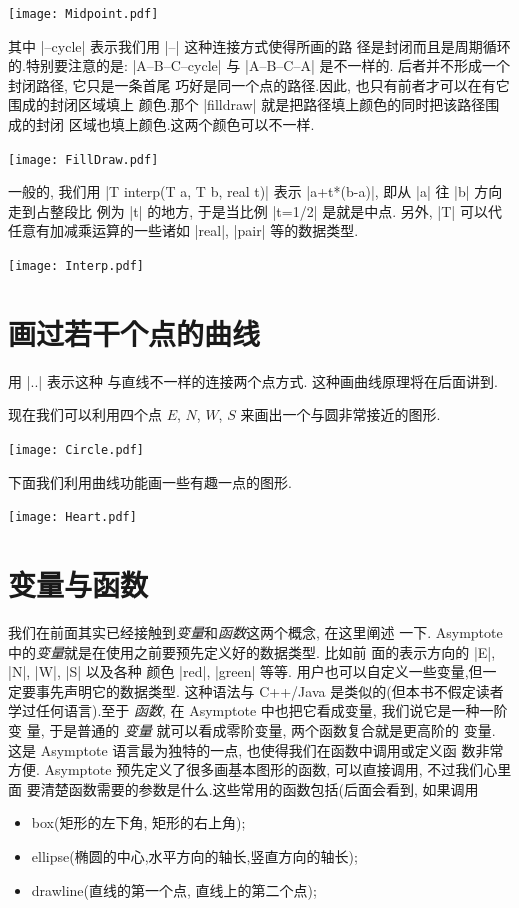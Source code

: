 \documentclass[nofonts,CJKnormalspaces]{ctexbook}
\begin{document}
\begin{center}\texttt{[image: Midpoint.pdf]}\end{center}%


其中 |--cycle| 表示我们用 |--| 这种连接方式使得所画的路
径是封闭而且是周期循环的.特别要注意的是: |A--B--C--cycle| 与
|A--B--C--A| 是不一样的. 后者并不形成一个封闭路径, 它只是一条首尾
巧好是同一个点的路径.因此, 也只有前者才可以在有它围成的封闭区域填上
颜色.那个 |filldraw| 就是把路径填上颜色的同时把该路径围成的封闭
区域也填上颜色.这两个颜色可以不一样.
\begin{center}\texttt{[image: FillDraw.pdf]}\end{center}%


一般的, 我们用 |T interp(T a, T b, real t)| 表示
|a+t*(b-a)|, 即从 |a| 往 |b| 方向走到占整段比
例为 |t| 的地方, 于是当比例 |t=1/2| 是就是中点. 另外,
|T| 可以代任意有加减乘运算的一些诸如 |real|,
|pair| 等的数据类型.
\begin{center}\texttt{[image: Interp.pdf]}\end{center}%


\section{画过若干个点的曲线}
用 |..| 表示这种
与直线不一样的连接两个点方式. 这种画曲线原理将在后面讲到.

现在我们可以利用四个点 $E$, $N$, $W$, $S$ 来画出一个与圆非常接近的图形.
\begin{center}\texttt{[image: Circle.pdf]}\end{center}%


下面我们利用曲线功能画一些有趣一点的图形.
\begin{center}\texttt{[image: Heart.pdf]}\end{center}%


\section{变量与函数}
我们在前面其实已经接触到\emph{变量}和\emph{函数}这两个概念, 在这里阐述
一下. Asymptote 中的\emph{变量}就是在使用之前要预先定义好的数据类型. 比如前
面的表示方向的 |E|, |N|, |W|, |S| 以及各种
颜色 |red|, |green| 等等. 用户也可以自定义一些变量,但一
定要事先声明它的数据类型. 这种语法与 C++/Java 是类似的(但本书不假定读者
学过任何语言).至于 \emph{函数}, 在 Asymptote 中也把它看成变量, 我们说它是一种一阶变
量, 于是普通的 \emph{变量} 就可以看成零阶变量, 两个函数复合就是更高阶的
变量. 这是 Asymptote 语言最为独特的一点, 也使得我们在函数中调用或定义函
数非常方便. Asymptote 预先定义了很多画基本图形的函数, 可以直接调用, 不过我们心里面
要清楚函数需要的参数是什么.这些常用的函数包括(后面会看到, 如果调用
\begin{itemize}
\item {box(矩形的左下角, 矩形的右上角);}
\item {ellipse(椭圆的中心,水平方向的轴长,竖直方向的轴长);}
\item {drawline(直线的第一个点, 直线上的第二个点);}
\end{itemize}
\end{document}
